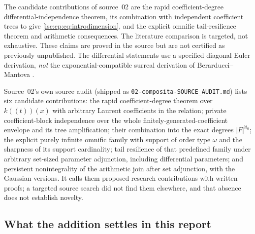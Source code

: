 \documentclass[11pt,letterpaper]{article}
\theoremstyle{definition}
\theoremstyle{remark}
\newcommand{\rpath}[1]{\nolinkurl{#1}}%
\numberwithin{equation}{section}
\begin{document}
The candidate contributions of source~02 are the rapid coefficient-degree
differential-independence theorem, its combination with independent
coefficient trees to give \eqref{isc:cp:eq:introdimension}, and the explicit
omnific tail-resilience theorem and arithmetic consequences. The literature
comparison is targeted, not exhaustive. These claims are proved in the
source but are not certified as previously unpublished. The differential
statements use a specified diagonal Euler derivation, \emph{not} the
exponential-compatible surreal derivation of Berarducci--Mantova \cite{BM}.

Source~02's own source audit (shipped as
\rpath{02-composita-SOURCE\_AUDIT.md}) lists six candidate contributions:
the rapid coefficient-degree theorem over $k((t))(x)$ with arbitrary Laurent
coefficients in the relation; private coefficient-block independence over
the whole finitely-generated-coefficient envelope and its tree
amplification; their combination into the exact degrees
$|F|^{\aleph_0}$; the explicit purely infinite omnific family with support
of order type $\omega$ and the sharpness of its support cardinality; tail
resilience of that predefined family under arbitrary set-sized parameter
adjunction, including differential parameters; and persistent
nonintegrality of the arithmetic join after set adjunction, with the
Gaussian versions. It calls them proposed research contributions with
written proofs; a targeted source search did not find them elsewhere, and
that absence does not establish novelty.

\subsection{What the addition settles in this report}
\label{isc:cp:sec:answers}
\end{document}
